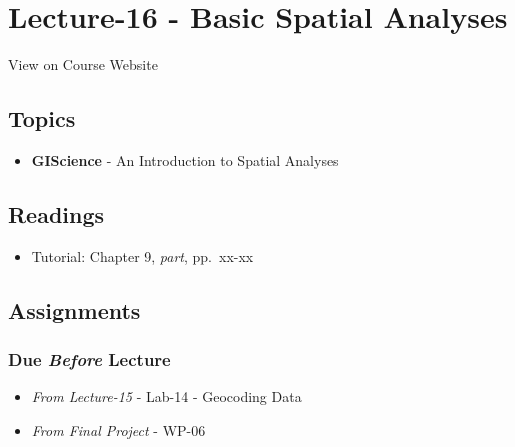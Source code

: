 \documentclass[]{book}
\providecommand{\tightlist}{%
  \setlength{\itemsep}{0pt}\setlength{\parskip}{0pt}}
\begin{document}
\hypertarget{lecture-16---basic-spatial-analyses}{%
\section*{Lecture-16 - Basic Spatial Analyses}\label{lecture-16---basic-spatial-analyses}}

View on Course Website

\hypertarget{topics-16}{%
\subsection*{Topics}\label{topics-16}}

\begin{itemize}
\tightlist
\item
  \textbf{GIScience} - An Introduction to Spatial Analyses
\end{itemize}

\hypertarget{readings-16}{%
\subsection*{Readings}\label{readings-16}}

\begin{itemize}
\tightlist
\item
  Tutorial: Chapter 9, \emph{part}, pp.~xx-xx
\end{itemize}

\hypertarget{assignments-17}{%
\subsection*{Assignments}\label{assignments-17}}

\hypertarget{due-before-lecture-15}{%
\subsubsection*{\texorpdfstring{Due \emph{Before} Lecture}{Due Before Lecture}}\label{due-before-lecture-15}}

\begin{itemize}
\tightlist
\item
  \emph{From Lecture-15} - Lab-14 - Geocoding Data
\item
  \emph{From Final Project} - WP-06
\end{itemize}
\end{document}
